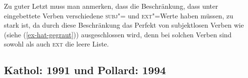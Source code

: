 {Zu guter Letzt muss man anmerken, dass die Beschränkung, dass unter \haben eingebettete
Verben verschiedene \textsc{subj}"= und \textsc{ext}"=Werte haben müssen, zu stark ist,
da durch diese Beschränkung das Perfekt von subjektlosen Verben
wie  (siehe (\ref{ex-hat-gegraut})) ausgeschlossen wird, denn bei solchen Verben sind
sowohl \subj als auch \textsc{ext} die leere Liste. 






\subsection{Kathol: 1991 und Pollard: 1994}
\label{kathol-pollard}




}
